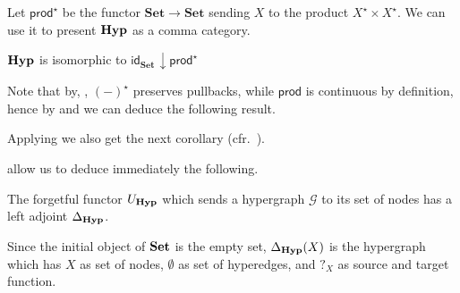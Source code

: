 \documentclass[3p]{elsarticle}
\newcommand{\Set}{\mathbf{Set}}
\newcommand{\catname}[1]{\textbf{\textup{#1}}}
\newcommand{\hyp}{\catname{Hyp}}
\newcommand{\pro}{\mathsf{prod}}
\renewcommand{\comma}[2]{#1\hspace{1pt} {\downarrow}#2}
\newcommand{\id}[1]{\mathsf{id}_{#1}}
\theoremstyle{remark}
\theoremstyle{definition}
\begin{document}
Let $\pro^\star$ be the functor $\Set\to \Set$ sending $X$ to the product $X^\star\times X^\star$.  We can use it to present $\hyp$ as a comma category.

\begin{prop}\label{prop:com}
	$\hyp$ is isomorphic to $\comma{\id{\Set}}{\pro^\star}$
\end{prop}

Note that by, , $(-)^\star$ preserves pullbacks, while $\pro$ is continuous by definition, 
hence by  and  we can deduce the following result.



Applying  we also get the next corollary (cfr.~\cite[Fact 4.17]{ehrig2006fundamentals}).


 allow us to deduce immediately the following.

\begin{prop}\label{cor:left}  The forgetful functor $U_{\hyp}$ which sends a hypergraph $\mathcal{G}$ to its set of nodes has a left adjoint $\Delta_{\hyp}$.
\end{prop}

\begin{exa}Since the initial object of $\catname{Set}$ is the empty set,  $\Delta_{\hyp}(X)$ is the hypergraph which has $X$ as set of nodes, $\emptyset$ as set of hyperedges, and $?_X$ as source and target function.
\end{exa}

\end{document}
